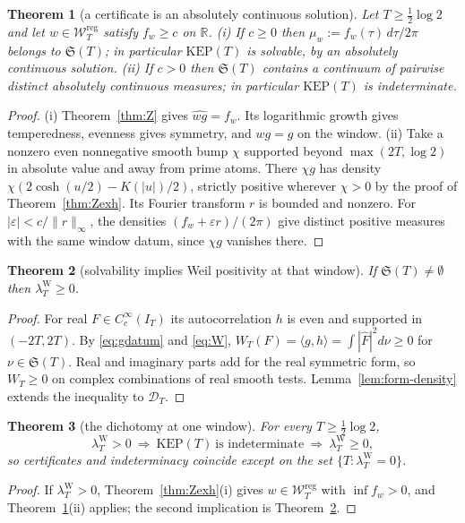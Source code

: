 \documentclass[10pt]{amsart}
\newtheorem{theorem}{Theorem}[section]
\theoremstyle{definition}
\theoremstyle{remark}
\newcommand{\R}{\mathbb R}
\newcommand{\IT}{I_T}
\newcommand{\lamW}{\lambda^{\mathrm W}_T}
\newcommand{\Fh}{\widehat F}
\newcommand{\Wcl}{\mathcal W_T}
\begin{document}
\begin{theorem}[a certificate is an absolutely continuous solution]\label{thm:KEP1}
Let $T\ge\frac12\log2$ and let $w\in\Wcl^{\mathrm{reg}}$ satisfy $f_w\ge c$ on $\R$.
\emph{(i)} If $c\ge0$ then $\mu_w:=f_w(\tau)\,d\tau/2\pi$ belongs to $\mathfrak S(T)$; in particular
$\mathrm{KEP}(T)$ is solvable, by an absolutely continuous solution.
\emph{(ii)} If $c>0$ then $\mathfrak S(T)$ contains a continuum of pairwise distinct absolutely
continuous measures; in particular $\mathrm{KEP}(T)$ is indeterminate.
\end{theorem}
\begin{proof}
(i) Theorem~\ref{thm:Z} gives $\widehat{wg}=f_w$. Its logarithmic growth
gives temperedness, evenness gives symmetry, and $wg=g$ on the window.
(ii) Take a nonzero even nonnegative smooth bump $\chi$ supported beyond
$\max(2T,\log2)$ in absolute value and away from prime atoms.
There $\chi g$ has density $\chi(2\cosh(u/2)-K(|u|)/2)$, strictly
positive wherever $\chi>0$ by the proof of Theorem~\ref{thm:Zexh}.
Its Fourier transform $r$ is bounded and nonzero. For
$|\varepsilon|<c/\|r\|_\infty$, the densities
$(f_w+\varepsilon r)/(2\pi)$ give distinct positive measures with
the same window datum, since $\chi g$ vanishes there.
\end{proof}

\begin{theorem}[solvability implies Weil positivity at that window]\label{thm:KEP2}
If $\mathfrak S(T)\ne\emptyset$ then $\lamW\ge0$.
\end{theorem}
\begin{proof}
For real $F\in C_c^\infty(\IT)$ its autocorrelation $h$ is even and
supported in $(-2T,2T)$. By \eqref{eq:gdatum} and \eqref{eq:W},
$W_T(F)=\langle g,h\rangle=\int|\Fh|^2d\nu\ge0$ for $\nu\in\mathfrak S(T)$.
Real and imaginary parts add for the real symmetric form, so $W_T\ge0$ on
complex combinations of real smooth tests. Lemma~\ref{lem:form-density}
extends the inequality to $\mathcal D_T$.
\end{proof}

\begin{theorem}[the dichotomy at one window]\label{thm:KEPdich}
For every $T\ge\frac12\log2$,
\[
\lamW>0\ \Longrightarrow\ \mathrm{KEP}(T)\ \text{is indeterminate}\ \Longrightarrow\ \lamW\ge0 ,
\]
so certificates and indeterminacy coincide except on the set $\{T:\lamW=0\}$.
\end{theorem}
\begin{proof}
If $\lamW>0$, Theorem~\ref{thm:Zexh}(i) gives $w\in\Wcl^{\mathrm{reg}}$ with $\inf f_w>0$, and
Theorem~\ref{thm:KEP1}(ii) applies; the second implication is Theorem~\ref{thm:KEP2}.
\end{proof}
\end{document}

